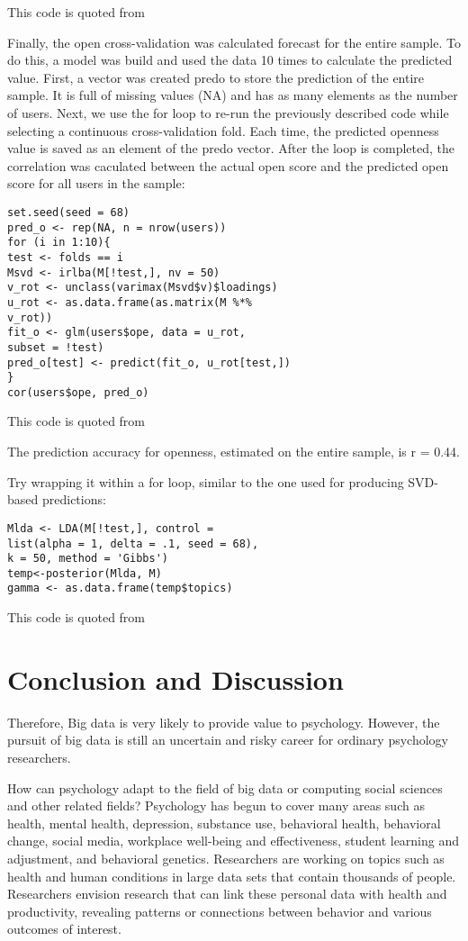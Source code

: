 This code is quoted from~\cite{editor12}

Finally, the open cross-validation was calculated forecast for the 
entire sample. To do this,  a model was build and used the data 10 
times to calculate the predicted value. First, a vector was created
predo to store the prediction of the entire sample. It is full of 
missing values (NA) and has as many elements as the number of 
users. Next, we use the for loop to re-run the previously described
 code while selecting a continuous cross-validation fold. Each 
time, the predicted openness value is saved as an element of the 
predo vector. After the loop is completed, the correlation was 
caculated between the actual open score and the predicted open 
score for all users in the sample:

\begin{verbatim}
set.seed(seed = 68)
pred_o <- rep(NA, n = nrow(users))
for (i in 1:10){
test <- folds == i
Msvd <- irlba(M[!test,], nv = 50)
v_rot <- unclass(varimax(Msvd$v)$loadings)
u_rot <- as.data.frame(as.matrix(M %*%
v_rot))
fit_o <- glm(users$ope, data = u_rot,
subset = !test)
pred_o[test] <- predict(fit_o, u_rot[test,])
}
cor(users$ope, pred_o)
\end{verbatim}

This code is quoted from~\cite{editor12}

The prediction accuracy for openness, estimated on the entire
sample, is r = 0.44.

Try wrapping it within a for loop, similar to the one used for 
producing SVD-based predictions:

\begin{verbatim}
Mlda <- LDA(M[!test,], control =
list(alpha = 1, delta = .1, seed = 68),
k = 50, method = 'Gibbs')
temp<-posterior(Mlda, M)
gamma <- as.data.frame(temp$topics)
\end{verbatim}

This code is quoted from~\cite{editor12}

\section{Conclusion and Discussion}

Therefore, Big data is very likely to provide value to psychology.
 However, the pursuit of big data is still an uncertain and risky 
career for ordinary psychology researchers.

How can psychology adapt to the field of big data or computing 
social sciences and other related fields? Psychology has begun to 
cover many areas such as health, mental health, depression, 
substance use, behavioral health, behavioral change, social media,
 workplace well-being and effectiveness, student learning and 
adjustment, and behavioral genetics. Researchers are working on 
topics such as health and human conditions in large data sets that
 contain thousands of people. Researchers envision research that 
can link these personal data with health and productivity, 
revealing patterns or connections between behavior and various 
outcomes of interest.


